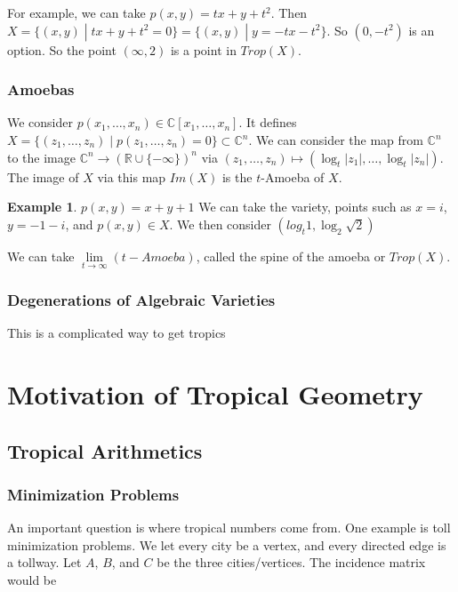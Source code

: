 \documentclass[11pt]{article}
\theoremstyle{definition}
\theoremstyle{plain}%
\theoremstyle{definition}
\newtheorem{protoexample}{Example}[section]
\newenvironment{ex}
   {\colorlet{shadecolor}{red!15}\begin{shaded}\begin{protoexample}}
   {\end{protoexample}\end{shaded}}
\def\RR{{\mathbb R}}
\def\CC{{\mathbb C}}
\begin{document}
For example, we can take $p(x,y) = tx + y + t^2$. Then $X = \{ (x,y) \; |\; tx+y+t^2 = 0\}= \{ (x,y) \; |\; y = -tx -t^2\} $. So $(0,-t^2)$ is an option. So the point $(\infty, 2)$ is a point in $Trop(X)$.



\subsubsection{Amoebas}

We consider $p(x_1, \dots, x_n) \in \CC[x_1, \dots, x_n]$. It defines $ X= \{(z_1, \dots, z_n) \; |\; p(z_1, \dots, z_n) = 0 \} \subset \CC^n$. We can consider the map  from $\CC^n$ to the image $\CC^n  \rightarrow  (\RR \cup \{-\infty\})^n$ via $(z_1, \dots, z_n) \mapsto (\log_t|z_1|, \dots, \log_t |z_n|) $. The image of $X$ via this map $Im(X)$ is the $t$-Amoeba of $X$. 


\begin{ex}
    $p(x,y) = x+y+1$ We can take the variety, points such as $x=i$, $y=-1-i$, and $p(x,y) \in X$. We then consider $(log_t 1, \log_2 \sqrt{2})$
\end{ex}


We can take $\lim\limits_{t \rightarrow \infty} (t-Amoeba)$, called the spine of the amoeba or $Trop(X)$.


\subsubsection{Degenerations of Algebraic Varieties}



This is a complicated way to get tropics



\section{Motivation of Tropical Geometry}

\subsection{Tropical Arithmetics}

\subsubsection{Minimization Problems}

An important question is where tropical numbers come from. One example is toll minimization problems. We let every city be a vertex, and every directed edge is a tollway. Let $A$, $B$, and $C$ be the three cities/vertices. The incidence matrix would be
\end{document}
